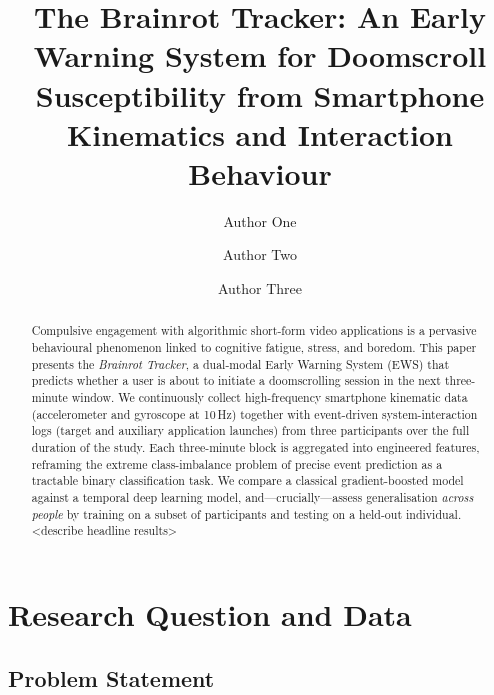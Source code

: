 \documentclass[runningheads]{llncs}
\begin{document}
\title{The Brainrot Tracker: An Early Warning System for Doomscroll Susceptibility from Smartphone Kinematics and Interaction Behaviour}

\author{Author One \and Author Two \and Author Three}



\maketitle

\begin{abstract}
Compulsive engagement with algorithmic short-form video applications is a pervasive
behavioural phenomenon linked to cognitive fatigue, stress, and boredom. This paper
presents the \emph{Brainrot Tracker}, a dual-modal Early Warning System (EWS) that
predicts whether a user is about to initiate a doomscrolling session in the next
three-minute window. We continuously collect high-frequency smartphone kinematic data
(accelerometer and gyroscope at 10\,Hz) together with event-driven system-interaction logs
(target and auxiliary application launches) from three participants over the full duration
of the study. Each three-minute block is aggregated into engineered features, reframing the
extreme class-imbalance problem of precise event prediction as a tractable binary
classification task. We compare a classical gradient-boosted model against a temporal deep
learning model, and---crucially---assess generalisation \emph{across people} by training on
a subset of participants and testing on a held-out individual. <describe headline results>

\end{abstract}


\section{Research Question and Data}\label{sec:intro}

\subsection{Problem Statement}
\end{document}
